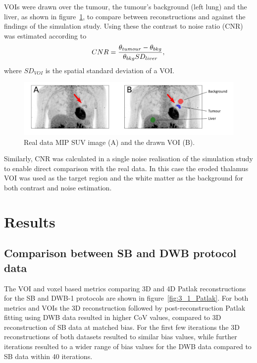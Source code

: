 VOIs were drawn over the tumour, the tumour's background (left lung) and the liver, as shown in figure~\ref{fig:2_5_VOIs}, to compare between reconstructions and against the findings of the simulation study. Using these the contrast to noise ratio (CNR) was estimated according to
\begin{equation}
CNR = \frac{\theta_{tumour} - \theta_{bkg}}{\theta_{bkg} SD_{liver}} \\, \\ 
\end{equation}
where $SD_{VOI}$ is the spatial standard deviation of a VOI. 
\begin{figure} [ht!]
\centering
\includegraphics[scale=0.47,angle=0]{3_Results/3_2_Dynamic_Reconstruction_SimulationStudy/figures/RealDataVOIs.pdf}
\caption{Real data MIP SUV image (A) and the drawn VOI (B).}
\label{fig:2_5_VOIs}
\end{figure} 

Similarly, CNR was calculated in a single noise realisation of the simulation study to enable direct comparison with the real data. In this case the eroded thalamus VOI was used as the target region and the white matter as the background for both contrast and noise estimation. 


\section*{Results}
 
\subsection*{Comparison between SB and DWB protocol data}
The VOI and voxel based metrics comparing 3D and 4D Patlak reconstructions for the SB and DWB-1 protocols are shown in figure~\ref{fig:3_1_Patlak}. For both metrics and VOIs the 3D reconstruction followed by post-reconstruction Patlak fitting using DWB data resulted in higher CoV values, compared to 3D reconstruction of SB data at matched bias. For the first few iterations the 3D reconstructions of both datasets resulted to similar bias values, while further iterations resulted to a wider range of bias values for the DWB data compared to SB data within 40 iterations.

